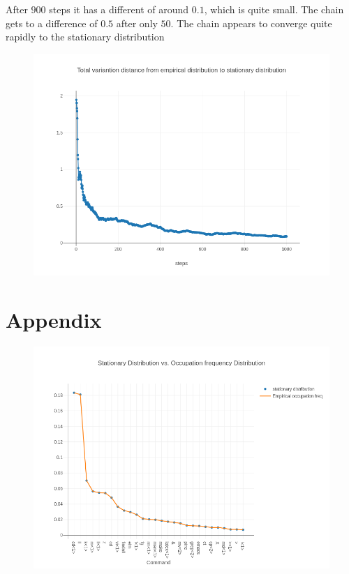 \documentclass[10pt]{article}
\begin{document}
After $900$ steps it has a different of around $0.1$, which is quite small. The chain gets to a difference of $0.5$ after only $50$. The chain appears to converge quite rapidly to the stationary distribution

\begin{figure}[!htb]
  \centering
  \includegraphics[scale=.45]{../pictures/mixing-time-analysis.png}
\end{figure}

\clearpage

\section{Appendix}

\begin{figure}[!htb]
  \centering
  \includegraphics[scale=.50]{../pictures/stat-dist-and-empirical-occ-freq-dist.png}
\end{figure}
\end{document}

